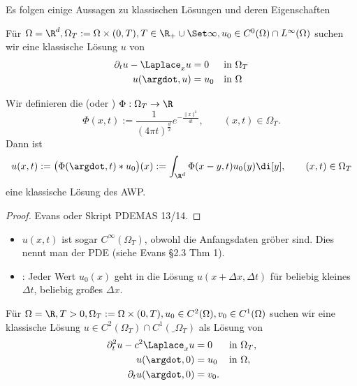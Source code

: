 Es folgen einige Aussagen zu klassischen Lösungen und deren Eigenschaften

\begin{df} \label{1.19}
	Für $\Omega = \R^d, \Omega_T := \Omega \times (0, T), T \in \R_+ \cup \Set \infty, u_0 \in C^0(\Omega) \cap L^\infty(\Omega)$ suchen wir eine klassische Lösung $u$ von
	\begin{align*}
		\partial_t u - \Laplace_x u &= 0  &&\text{in $\Omega_T$}\\
		u(\argdot, u) &= u_0  &&\text{in $\Omega$}
	\end{align*}
\end{df}

\begin{st} \label{2.20}
	Wir definieren die  (oder ) $\Phi: \Omega_T \to \R$
	\[
		\Phi(x,t) := \frac{1}{(4\pi t)^{\frac{d}{2}}} e^{- \frac{\|x\|^2}{4t}},
		\qquad (x,t) \in \Omega_T.
	\]
	Dann ist
	\[
		u(x,t) := \big(\Phi(\argdot, t) \ast u_0\big) (x) := \int_{\R^d} \Phi(x-y, t) u_0(y) \di[y],
		\qquad (x,t) \in \Omega_T
	\]
	eine klassische Lösung des AWP.
	\begin{proof}
		Evans oder Skript PDEMAS 13/14.
	\end{proof}
	\begin{note}
		\begin{itemize}
			\item
				$u(x,t)$ ist sogar $C^\infty(\Omega_T)$, obwohl die Anfangsdaten gröber sind.
				Dies nennt man  der PDE (siehe Evans §2.3 Thm 1).
			\item
				: Jeder Wert $u_0(x)$ geht in die Lösung $u(x + \Delta x, \Delta t)$ für beliebig kleines $\Delta t$, beliebig großes $\Delta x$.
		\end{itemize}
	\end{note}
\end{st}

\begin{df}[AWP für Wellengleichung, $d = 1$] \label{1.21}
	Für $\Omega = \R, T > 0, \Omega_T := \Omega \times (0, T), u_0 \in C^2(\Omega), v_0 \in C^1(\Omega)$ suchen wir eine klassische Lösung $u \in C^2(\Omega_T) \cap C^1(\_{\Omega_T})$ als Lösung von
	\begin{align*}
		\partial_t^2 u - c^2 \Laplace_x u &= 0 &&\text{in $\Omega_T$}, \\
		u(\argdot, 0) &= u_0  && \text{in $\Omega$}, \\
		\partial_t u(\argdot, 0) &= v_0.
	\end{align*}
\end{df}

